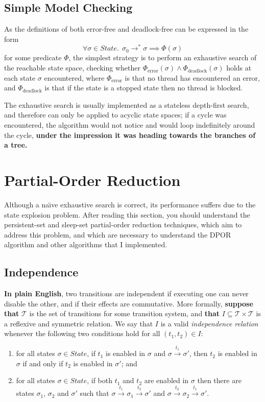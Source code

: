 \documentclass[12pt,a4paper,twoside,openright]{report}
\begin{document}
\subsection{Simple Model Checking}
\label{sec:simple-prep}
As the definitions of both error-free and deadlock-free
can be expressed in the form
\[
	\forall \sigma \in \textit{State}.\;\, \sigma_0 \longrightarrow^* \sigma
	\implies \Phi (\sigma)
\]
for some predicate $\Phi$, the simplest strategy is to
perform an exhaustive search of the reachable state space,
checking whether $\Phi_\text{error}(\sigma) \wedge
\Phi_\text{deadlock}(\sigma)$
holds at each state $\sigma$ encountered,
where $\Phi_\text{error}$ is that
no thread has encountered an error, and $\Phi_\text{deadlock}$ is
that if the state is a stopped state then no
thread is blocked.

The exhaustive search is usually
implemented as a stateless depth-first search,
and therefore can only be applied to acyclic state spaces; if
a cycle was encountered, the algorithm
would not notice and would loop indefinitely
around the cycle, \textbf{under the impression it
was heading towards the branches of a tree.}

\section{Partial-Order Reduction}

Although a na\"{\i}ve exhaustive search
is correct, its performance suffers due to
the state explosion problem.
After reading this section, you should
understand the persistent-set and sleep-set
partial-order reduction techniques, which
aim to address this problem, and which
are necessary to understand the DPOR
algorithm and other algorithms that I
implemented.

\subsection{Independence} \label{sec:independence}
\textbf{In plain English}, two transitions are independent if executing one
can never disable the other, and if their effects are commutative.
More formally, \textbf{suppose that} $\mathcal{T}$ is the set of
transitions for some transition system, and
\textbf{that} $I \subseteq \mathcal{T} \times \mathcal{T}$
is a reflexive and symmetric relation. We say
that $I$ is a valid \emph{independence relation}
whenever the following two conditions hold for
all $(t_1, t_2) \in I$:
\begin{enumerate}
	\item for all states $\sigma \in \textit{State}$,
		if $t_1$ is enabled in $\sigma$ and
		$\sigma \xrightarrow{t_1} \sigma'$, then
		$t_2$ is enabled in $\sigma$ if and only if
		$t_2$ is enabled in $\sigma'$; and
	\item for all states $\sigma \in \textit{State}$,
		if both $t_1$ and $t_2$ are enabled in $\sigma$
		then there are states $\sigma_1$, $\sigma_2$ and
		$\sigma'$ such that
		$\sigma \xrightarrow{t_1} \sigma_1 \xrightarrow{t_2} \sigma'$
		and
		$\sigma \xrightarrow{t_2} \sigma_2 \xrightarrow{t_1} \sigma'$.
\end{enumerate}
\end{document}
